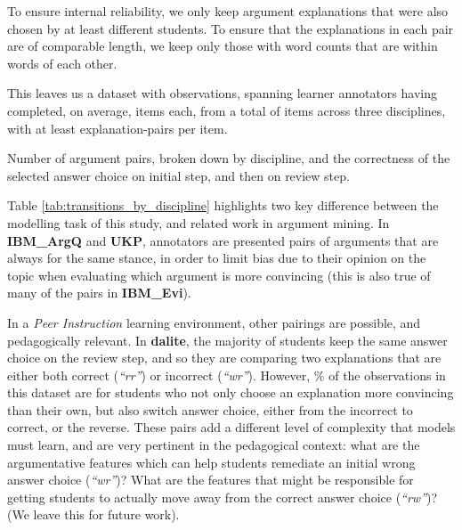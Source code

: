 \documentclass[runningheads]{llncs}
\begin{document}
To ensure internal reliability, we only keep argument explanations that were 
also chosen by at least different 
students. 
To ensure that the explanations in each pair are of comparable length, we keep 
only those with word counts that are within 
words of each other. 

This leaves us a dataset with observations, 
spanning  learner annotators having 
completed, on average, 
 items each, from a total of 
 items across three disciplines, 
with at least 
explanation-pairs 
per item.


\begin{table}
	\caption{Number of argument pairs, broken down by discipline, and the 
	correctness of the selected answer choice on initial step, and then on 
	review step.}
	
	\centerline{}
	
	\label{tab:transitions_by_discipline}
\end{table}

Table \ref{tab:transitions_by_discipline} highlights two key difference between 
the modelling task of this study, and related work in argument mining. 
In \textbf{IBM\_ArgQ} and \textbf{UKP}, annotators are presented pairs of 
arguments that are always for the same stance, in order to limit bias due to 
their opinion on the topic when evaluating which argument is more convincing 
(this is also true of many of the pairs in \textbf{IBM\_Evi}).

In a \textit{Peer Instruction} learning environment, other pairings are 
possible, and pedagogically relevant. 
In \textbf{dalite}, the majority of students keep the same answer choice 
on the review step, and so they are comparing two explanations that 
are either both correct (\textit{``rr''}) or incorrect (\textit{``wr''}). 
However, \% of the 
observations in this dataset are for students who not only choose an 
explanation more convincing than their own, but also switch answer choice, 
either from the incorrect to correct, or the reverse. 
These pairs add a different level of complexity that models must learn, and are 
very pertinent in the pedagogical context: what are the argumentative features 
which can help students remediate an initial wrong answer choice 
(\textit{``wr''})?
What are the features that might be responsible for getting students to 
actually move away from the correct answer choice (\textit{``rw''})?
(We leave this for future work).
 
\end{document}
